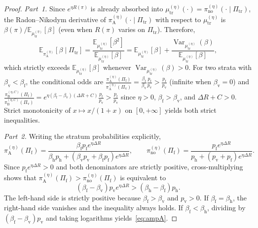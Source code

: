 \documentclass[11pt,a4paper]{article}
\newcommand{\E}{\mathbb{E}}
\newcommand{\Var}{\operatorname{Var}}
\begin{document}
\begin{proof}
\emph{Part~1.} Since $e^{\eta R(\pi)}$ is already absorbed into $\mu_{\mathrm{tr}}^{(\eta)}(\cdot) = \pi_{\mathrm{no}}^{(\eta)}(\cdot \mid \Pi_{\mathrm{tr}})$, the Radon--Nikodym derivative of $\pi_{\mathrm{A}}^{(\eta)}(\cdot \mid \Pi_{\mathrm{tr}})$ with respect to $\mu_{\mathrm{tr}}^{(\eta)}$ is $\beta(\pi) / \E_{\mu_{\mathrm{tr}}^{(\eta)}}[\beta]$ (even when $R(\pi)$ varies on $\Pi_{\mathrm{tr}}$). Therefore,
\[
  \E_{\pi_{\mathrm{A}}^{(\eta)}}[\beta \mid \Pi_{\mathrm{tr}}]
  = \frac{\E_{\mu_{\mathrm{tr}}^{(\eta)}}[\beta^2]}{\E_{\mu_{\mathrm{tr}}^{(\eta)}}[\beta]}
  = \E_{\mu_{\mathrm{tr}}^{(\eta)}}[\beta] + \frac{\Var_{\mu_{\mathrm{tr}}^{(\eta)}}(\beta)}{\E_{\mu_{\mathrm{tr}}^{(\eta)}}[\beta]},
\]
which strictly exceeds $\E_{\mu_{\mathrm{tr}}^{(\eta)}}[\beta]$ whenever $\Var_{\mu_{\mathrm{tr}}^{(\eta)}}(\beta) > 0$. For two strata with $\beta_{\mathrm{v}} < \beta_{\mathrm{f}}$, the conditional odds are $\frac{\pi_{\mathrm{A}}^{(\eta)}(\Pi_{\mathrm{f}})}{\pi_{\mathrm{A}}^{(\eta)}(\Pi_{\mathrm{v}})} = \frac{\beta_{\mathrm{f}}}{\beta_{\mathrm{v}}}\frac{p_{\mathrm{f}}}{p_{\mathrm{v}}} > \frac{p_{\mathrm{f}}}{p_{\mathrm{v}}}$ (infinite when $\beta_{\mathrm{v}} = 0$) and $\frac{\pi_{\mathrm{B}}^{(\eta, C)}(\Pi_{\mathrm{f}})}{\pi_{\mathrm{B}}^{(\eta, C)}(\Pi_{\mathrm{v}})} = e^{\eta(\beta_{\mathrm{f}} - \beta_{\mathrm{v}})(\Delta R + C)}\frac{p_{\mathrm{f}}}{p_{\mathrm{v}}} > \frac{p_{\mathrm{f}}}{p_{\mathrm{v}}}$ since $\eta > 0$, $\beta_{\mathrm{f}} > \beta_{\mathrm{v}}$, and $\Delta R + C > 0$. Strict monotonicity of $x \mapsto x/(1+x)$ on $[0, +\infty]$ yields both strict inequalities.

\emph{Part~2.} Writing the stratum probabilities explicitly,
\[
  \pi_{\mathrm{A}}^{(\eta)}(\Pi_{\mathrm{f}})
  = \frac{\beta_{\mathrm{f}} p_{\mathrm{f}} e^{\eta \Delta R}}{\beta_{\mathrm{h}} p_{\mathrm{h}} + (\beta_{\mathrm{v}} p_{\mathrm{v}} + \beta_{\mathrm{f}} p_{\mathrm{f}}) e^{\eta \Delta R}},
  \qquad
  \pi_{\mathrm{no}}^{(\eta)}(\Pi_{\mathrm{f}})
  = \frac{p_{\mathrm{f}} e^{\eta \Delta R}}{p_{\mathrm{h}} + (p_{\mathrm{v}} + p_{\mathrm{f}}) e^{\eta \Delta R}}.
\]
Since $p_{\mathrm{f}} e^{\eta \Delta R} > 0$ and both denominators are strictly positive, cross-multiplying shows that $\pi_{\mathrm{A}}^{(\eta)}(\Pi_{\mathrm{f}}) > \pi_{\mathrm{no}}^{(\eta)}(\Pi_{\mathrm{f}})$ is equivalent to
\[
  (\beta_{\mathrm{f}} - \beta_{\mathrm{v}}) p_{\mathrm{v}} e^{\eta \Delta R} > (\beta_{\mathrm{h}} - \beta_{\mathrm{f}}) p_{\mathrm{h}}.
\]
The left-hand side is strictly positive because $\beta_{\mathrm{f}} > \beta_{\mathrm{v}}$ and $p_{\mathrm{v}} > 0$. If $\beta_{\mathrm{f}} = \beta_{\mathrm{h}}$, the right-hand side vanishes and the inequality always holds. If $\beta_{\mathrm{f}} < \beta_{\mathrm{h}}$, dividing by $(\beta_{\mathrm{f}} - \beta_{\mathrm{v}})p_{\mathrm{v}}$ and taking logarithms yields~\eqref{eq:ampA}.


\end{proof}
\end{document}
